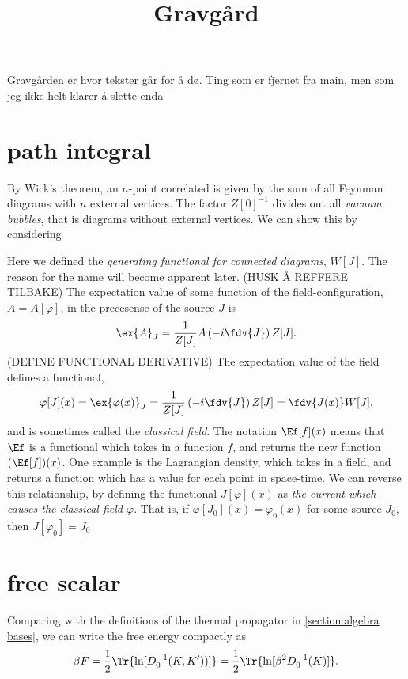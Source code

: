 \documentclass{article}
\title{Gravgård}
\date{}
\begin{document}
    \maketitle
    Gravgården er hvor tekster går for å dø. Ting som er fjernet fra main, men som jeg ikke helt klarer å slette enda
    \section{path integral}
    By Wick's theorem, an $n$-point correlated is given by the sum of all Feynman diagrams with $n$ external vertices.
    The factor $Z[0]^{-1}$ divides out all \emph{vacuum bubbles}, that is diagrams without external vertices.
    We can show this by considering 

    Here we defined the \emph{generating functional for connected diagrams}, $W[J]$.
    The reason for the name will become apparent later. (HUSK Å REFFERE TILBAKE)
    The expectation value of some function of the field-configuration, $A = A[\varphi]$, in the precesense of the source $J$ is
    \begin{equation}
        \ex{A}_J = \frac{1}{Z[J]} A\left( -i  \fdv{J}\right) Z[J].
    \end{equation}
    (DEFINE FUNCTIONAL DERIVATIVE)
    The expectation value of the field defines a functional,
    \begin{equation}
        \label{calssical field functional}
        \varphi[J](x) = \ex{\varphi(x)}_J = 
        \frac{1}{Z[J]} \left( -i  \fdv{J}\right) Z[J]
        = \fdv{J(x)} W[J],
    \end{equation}
    and is sometimes called the \emph{classical field}.
    The notation $\Ef[f](x)$ means that $\Ef$ is a functional which takes in a function $f$, and returns the new function $(\Ef[f])(x)$.
    One example is the Lagrangian density, which takes in a field, and returns a function which has a value for each point in space-time.
    We can reverse this relationship, by defining the functional $J[\varphi](x)$ as \emph{the current which causes the classical field $\varphi$}.
    That is, if $\varphi[J_0](x) = \varphi_0(x)$ for some source $J_0$, then $J[\varphi_0] = J_0$

\section{free scalar}
    Comparing with the definitions of the thermal propagator in \autoref{section:algebra bases}, we can write the free energy compactly as
    \begin{equation}
        \label{free energy from propagator}
        \beta F = \frac{1}{2} \Tr{\ln[D_0^{-1}(K, K'))]} 
        = \frac{1}{2} \Tr{\ln[\beta^2 D_0^{-1}(K)]}.
    \end{equation}
\end{document}
